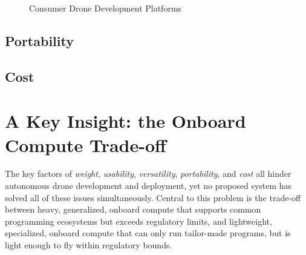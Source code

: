 \begin{figure}
    \centering
    \qquad
    \caption{Consumer Drone Development Platforms}
    \label{fig:drone-dev-platforms}
\end{figure}

\subsection{Portability}

\subsection{Cost}

\section{A Key Insight: the Onboard Compute Trade-off}
\label{sec:better-autonomous-drones}
The key factors of \textit{weight}, \textit{usability}, \textit{versatility}, \textit{portability}, and \textit{cost} all hinder autonomous drone development and deployment, yet no proposed system has solved all of these issues simultaneously. Central to this problem is the trade-off between heavy, generalized, onboard compute that supports common programming ecosystems but exceeds regulatory limits, and lightweight, specialized, onboard compute that can only run tailor-made programs, but is light enough to fly within regulatory bounds. 




